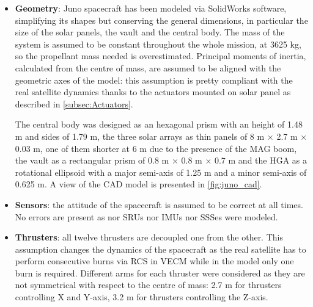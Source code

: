 \begin{itemize}
    \item
    \begin{minipage}[t]{0.723\linewidth}
        \textbf{Geometry}: Juno spacecraft has been modeled via SolidWorks software, simplifying its shapes but conserving the general dimensions, in particular the size of the solar panels, the vault and the central body. The mass of the system is assumed to be constant throughout the whole mission, at 3625 kg, so the propellant mass needed is overestimated.
        Principal moments of inertia, calculated from the centre of mass, are assumed to be aligned with the geometric axes of the model: this assumption is pretty compliant with the real satellite dynamics thanks to the actuators mounted on solar panel as described in \autoref{subsec:Actuators}. 
       
        The central body was designed as an hexagonal prism with an height of 1.48 m and sides of 1.79 m, the three solar arrays as thin panels of 8 m $\times$ 2.7 m $\times$ 0.03 m, one of them shorter at 6 m due to the presence of the MAG boom, the vault as a rectangular prism of 0.8 m $\times$ 0.8 m $\times$ 0.7 m and the HGA as a rotational ellipsoid with a major semi-axis of 1.25 m and a minor semi-axis of 0.625 m. 
        A view of the CAD model is presented in \autoref{fig:juno_cad}.
    \end{minipage}\hfill
    \begin{minipage}[t]{0.277\linewidth}
        \vspace*{-10mm}
    \end{minipage}
    \item \textbf{Sensors}: the attitude of the spacecraft is assumed to be correct at all times. No errors are present as nor SRUs nor IMUs nor SSSes were modeled. 
    
    \item \textbf{Thrusters}: all twelve thrusters are decoupled one from the other. This assumption changes the dynamics of the spacecraft as the real satellite has to perform consecutive burns via RCS in VECM while in the model only one burn is required. 
    Different arms for each thruster were considered as they are not symmetrical with respect to the centre of mass: 2.7 m for thrusters controlling X and Y-axis, 3.2 m for thrusters controlling the Z-axis.


\end{itemize}
